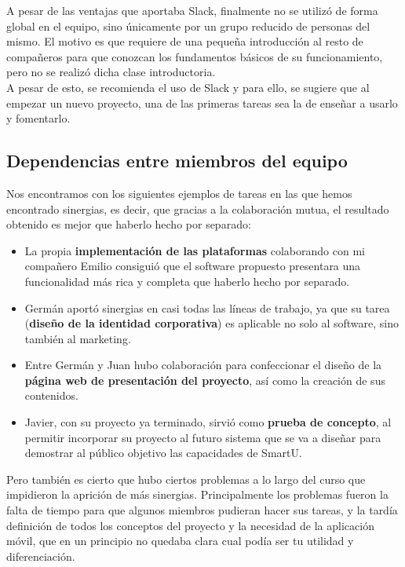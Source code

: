 A pesar de las ventajas que aportaba Slack, finalmente no se utilizó de forma global en el equipo, sino únicamente por un grupo reducido de personas del mismo. El motivo es que requiere de una pequeña introducción al resto de compañeros para que conozcan los fundamentos básicos de su funcionamiento, pero no se realizó dicha clase introductoria.\\

A pesar de esto, se recomienda el uso de Slack y para ello, se sugiere que al empezar un nuevo proyecto, una de las primeras tareas sea la de enseñar a usarlo y fomentarlo.

\subsection{Dependencias entre miembros del equipo}
Nos encontramos con los siguientes ejemplos de tareas en las que hemos encontrado sinergias, es decir, que gracias a la colaboración mutua, el resultado obtenido es mejor que haberlo hecho por separado:

\begin{itemize}
    \item La propia \textbf{implementación de las plataformas} colaborando con mi compañero Emilio consiguió que el software propuesto presentara una funcionalidad más rica y completa que haberlo hecho por separado.
    \item Germán aportó sinergias en casi todas las líneas de trabajo, ya que su tarea (\textbf{diseño de la identidad corporativa}) es aplicable no solo al software, sino también al marketing.
    \item Entre Germán y Juan hubo colaboración para confeccionar el diseño de la \textbf{página web de presentación del proyecto}, así como la creación de sus contenidos.
    \item Javier, con su proyecto ya terminado, sirvió como \textbf{prueba de concepto}, al permitir incorporar su proyecto al futuro sistema que se va a diseñar para demostrar al público objetivo las capacidades de SmartU.
\end{itemize}

Pero también es cierto que hubo ciertos problemas a lo largo del curso que impidieron la aprición de más sinergias. Principalmente los problemas fueron la falta de tiempo para que algunos miembros pudieran hacer sus tareas, y la tardía definición de todos los conceptos del proyecto y la necesidad de la aplicación móvil, que en un principio no quedaba clara cual podía ser tu utilidad y diferenciación.\\

